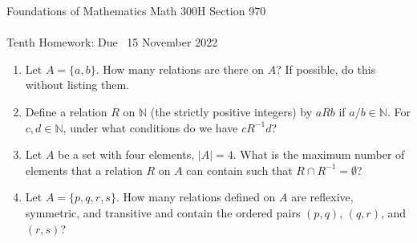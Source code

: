 \documentclass[12pt]{article}
\newcommand{\NN}{{\mathbb N}}  %
\begin{document}
\LARGE 
\noindent
{\color{Maroon}Foundations of Mathematics \hfill Math 300H Section 970}\vspace{2pt}\\
\Large \vspace{2pt}\\
\large
Tenth Homework: \hfill Due \  15 November 2022
\normalsize\medskip


\noindent{\color{blue}\rule{528.3675pt}{2pt}}


\begin{enumerate}  %

\item  Let $A=\{a,b\}$. How many relations are there on $A$?  If possible, do this without listing them.

\item Define a relation $R$ on $\NN$ (the strictly positive integers) by $aRb$ if $a/b\in \NN$.
  For $c,d\in\NN$, under what conditions do we have $cR^{-1} d$?

\item Let $A$ be a set with four elements, $|A|=4$.
      What is the maximum number of elements that a relation $R$ on $A$ can contain such that $R\cap R^{-1}=\emptyset$?

\item Let $A = \{p,q,r,s\}$.
      How many relations defined on $A$ are reflexive, symmetric, and transitive and contain
      the ordered pairs $(p,q)$, $(q,r)$, and $(r,s)$?
    

\end{enumerate}
\end{document}
